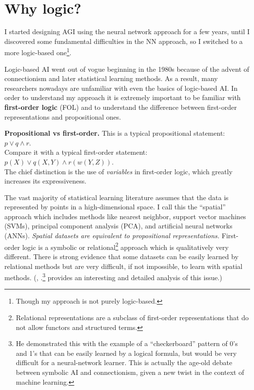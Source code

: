\section{Why logic?}
\label{sec:why-logic}

I started designing AGI using the neural network approach for a few years, until I discovered some fundamental difficulties in the NN approach, so I switched to a more logic-based one\footnote{Though my approach is not purely logic-based.}.

Logic-based AI went out of vogue beginning in the 1980s because of the advent of connectionism and later statistical learning methods.  As a result, many researchers nowadays are unfamiliar with even the basics of logic-based AI.  In order to understand my approach it is extremely important to be familiar with \textbf{first-order logic} (FOL) and to understand the difference between first-order representations and propositional ones.

\textbf{Propositional vs first-order.}  This is a typical propositional statement:\\
\hspace*{1cm} $ p \vee q \wedge r $.\\
Compare it with a typical first-order statement:\\
\hspace*{1cm} $ p(X) \vee q(X,Y) \wedge r(w(Y,Z)) $.\\
The chief distinction is the use of \emph{variables} in first-order logic, which greatly increases its expressiveness.

The vast majority of statistical learning literature assumes that the data is represented by points in a high-dimensional space.  I call this the ``spatial'' approach which includes methods like nearest neighbor, support vector machines (SVMs), principal component analysis (PCA), and artificial neural networks (ANNs).  \textit{Spatial datasets are equivalent to propositional representations.}  First-order logic is a symbolic or relational\footnote{Relational representations are a subclass of first-order representations that do not allow functors and structured terms.} approach which is qualitatively very different.  There is strong evidence that some datasets can be easily learned by relational methods but are very difficult, if not impossible, to learn with spatial methods.  (\citep*{Thornton1996}, \citep*{Thornton2000}.\footnote{He demonstrated this with the example of a ``checkerboard'' pattern of 0's and 1's that can be easily learned by a logical formula, but would be very difficult for a neural-network learner.  This is actually the age-old debate between symbolic AI and connectionism, given a new twist in the context of machine learning.} provides an interesting and detailed analysis of this issue.)

